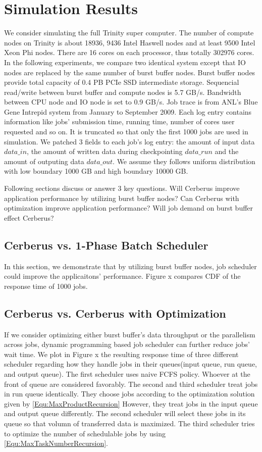 \section{Simulation Results}
We consider simulating the full Trinity super computer.
The number of compute nodes on Trinity is about 18936, 9436 Intel Haswell nodes and at least 9500 Intel Xeon Phi nodes.
There are 16 cores on each processor, thus totally 302976 cores.
In the following experiments, we compare two identical system except that IO nodes are replaced by the same number of burst buffer nodes.
Burst buffer nodes provide total capacity of 0.4 PB PCIe SSD intermediate storage.
Sequencial read/write between burst buffer and compute nodes is 5.7 GB/s.
Bandwidth between CPU node and IO node is set to 0.9 GB/s.
Job trace is from ANL's Blue Gene Intrepid system from January to September 2009.
Each log entry contains information like jobs' submission time, running time, number of cores user requested and so on. 
It is truncated so that only the first 1000 jobs are used in simulation.
We patched 3 fields to each job's log entry: the amount of input data $data\_in$, the amount of written data during checkpointing $data\_run$ and the amount of outputing data $data\_out$.
We assume they follows uniform distribution with low boundary 1000 GB and high boundary 10000 GB.

Following sections discuss or answer 3 key questions.
Will Cerberus improve application performance by utilizing burst buffer nodes?
Can Cerberus with optimization improve application performance?
Will job demand on burst buffer effect Cerberus?

\subsection{Cerberus vs. 1-Phase Batch Scheduler}
In this section, we demonstrate that by utilizing burst buffer nodes, job scheduler could improve the applicaitons' performance.
Figure x compares CDF of the response time of 1000 jobs.

\subsection{Cerberus vs. Cerberus with Optimization}
If we consider optimizing either burst buffer's data throughput or the parallelism across jobs, dynamic programming based job scheduler can further reduce jobs' wait time.
We plot in Figure x the resulting response time of three different scheduler regarding how they handle jobs in their queues(input queue, run queue, and output queue).
The first scheduler uses naive FCFS policy.
Whoever at the front of queue are considered favorably.
The second and third scheduler treat jobs in run queue identically.
They choose jobs according to the optimization solution given by \ref{Equ:MaxProductRecursion}
However, they treat jobs in the input queue and output queue differently.
The second scheduler will select these jobs in its queue so that volumn of transferred data is maximized.
The third scheduler tries to optimize the number of schedulable jobs by using \ref{Equ:MaxTaskNumberRecursion}.

